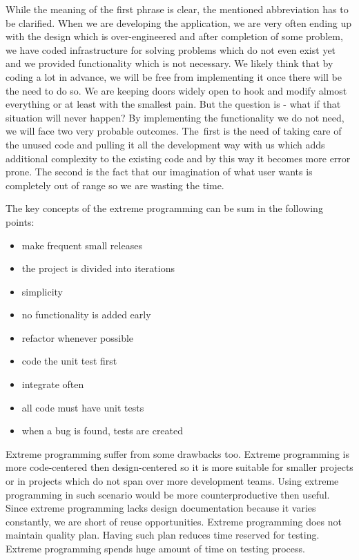 \documentclass[12pt,final,oneside]{fithesis}
\begin{document}
While the meaning of the first phrase is clear, the mentioned abbreviation has to be clarified. When we are developing the application, we are very often ending up with the design which is over-engineered and after completion of some problem, we have coded infrastructure for solving problems which do not even exist yet and we provided functionality which is not necessary. We likely think that by coding a lot in advance, we will be free from implementing it once there will be the need to do so. We are keeping doors widely open to hook and modify almost everything or at least with the smallest pain. But the question is - what if that situation will never happen? By implementing the functionality we do not need, we will face two very probable outcomes. The~first is the need of taking care of the unused code and pulling it all the development way with us which adds additional complexity to the  existing code and by this way it becomes more error prone. The second is the fact that our imagination of what user wants is completely out of range so we are wasting the time.

The key concepts of the extreme programming can be sum in the following points:
\begin{itemize}
	\item make frequent small releases
	\item the project is divided into iterations
	\item simplicity
	\item no functionality is added early
	\item refactor whenever possible
	\item code the unit test first
	\item integrate often
	\item all code must have unit tests
	\item when a bug is found, tests are created
\end{itemize}   

Extreme programming suffer from some drawbacks too. Extreme programming is more code-centered then design-centered so it is more suitable for smaller projects or in projects which do not span over more development teams. Using extreme programming in such scenario would be more counterproductive then useful. Since extreme programming lacks design documentation because it varies constantly, we are short of reuse opportunities. Extreme programming does not maintain quality plan. Having such plan reduces time reserved for testing. Extreme programming spends huge amount of time on testing process. 
\end{document}
